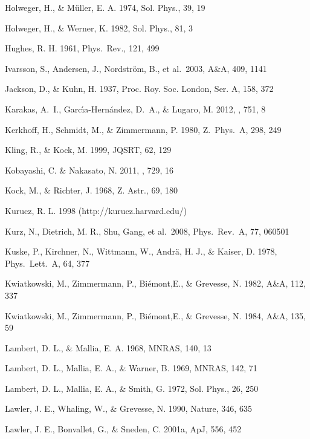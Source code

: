 \documentclass[traditabstract]{aa}
\begin{document}
\begin{thebibliography}{}
  Holweger, H., \& M\"{u}ller, E. A. 1974, Sol. Phys., 39, 19

  Holweger, H., \& Werner, K. 1982, Sol. Phys., 81, 3

  Hughes, R. H. 1961, Phys.\ Rev., 121, 499

  Ivarsson, S., Andersen, J., Nordstr\"om, B., et al.\ 2003, A\&A, 409, 1141

  Jackson, D., \& Kuhn, H. 1937, Proc. Roy. Soc. London, Ser. A, 158, 372

  {Karakas}, A.~I., {Garc{\'{\i}}a-Hern{\'a}ndez}, D.~A., \& {Lugaro}, M. 2012, \apj, 751, 8

  Kerkhoff, H., Schmidt, M., \& Zimmermann, P. 1980, Z.\ Phys.\ A, 298, 249

  Kling, R., \&  Kock, M. 1999, JQSRT, 62, 129

  {Kobayashi}, C. \& {Nakasato}, N. 2011, \apj, 729, 16

  Kock, M., \& Richter, J. 1968, Z. Astr., 69, 180

  Kurucz, R. L. 1998 (http://kurucz.harvard.edu/)

  Kurz, N., Dietrich, M. R., Shu, Gang, et al.\ 2008, Phys.\ Rev.\ A, 77, 060501

  Kuske, P., Kirchner, N., Wittmann, W., Andr\"a, H. J., \& Kaiser, D. 1978, Phys.\ Lett.\ A, 64, 377
 
  Kwiatkowski, M., Zimmermann, P., Bi\'emont,E., \& Grevesse, N. 1982, A\&A, 112, 337

  Kwiatkowski, M., Zimmermann, P., Bi\'emont,E., \& Grevesse, N. 1984, A\&A, 135, 59

  Lambert, D. L.,  \& Mallia, E. A. 1968, MNRAS, 140, 13

  Lambert, D. L.,  Mallia, E. A., \& Warner, B. 1969, MNRAS, 142, 71

  Lambert, D. L., Mallia, E. A., \& Smith, G. 1972, Sol. Phys., 26, 250
 
  Lawler, J. E., Whaling, W., \& Grevesse, N. 1990, Nature, 346, 635

  Lawler, J. E., Bonvallet, G., \& Sneden, C. 2001a, ApJ, 556, 452


\end{thebibliography}
\end{document}
